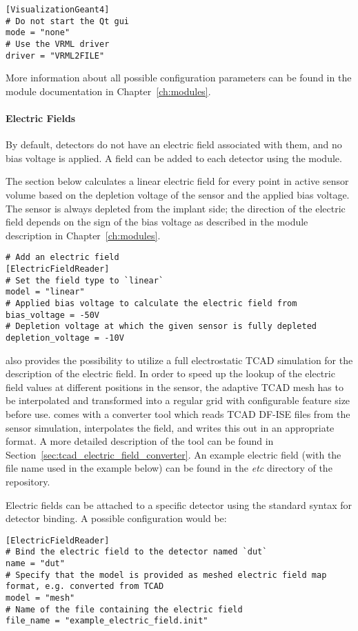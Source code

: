 \begin{itemize}
\begin{verbatim}
[VisualizationGeant4]
# Do not start the Qt gui
mode = "none"
# Use the VRML driver
driver = "VRML2FILE"
\end{verbatim}

More information about all possible configuration parameters can be found in the module documentation in Chapter~\ref{ch:modules}.

\paragraph{Electric Fields}
\label{sec:module_electric_field}
By default, detectors do not have an electric field associated with them, and no bias voltage is applied.
A field can be added to each detector using the  module.

The section below calculates a linear electric field for every point in active sensor volume based on the depletion voltage of the sensor and the applied bias voltage.
The sensor is always depleted from the implant side; the direction of the electric field depends on the sign of the bias voltage as described in the module description in Chapter~\ref{ch:modules}.
\begin{verbatim}
# Add an electric field
[ElectricFieldReader]
# Set the field type to `linear`
model = "linear"
# Applied bias voltage to calculate the electric field from
bias_voltage = -50V
# Depletion voltage at which the given sensor is fully depleted
depletion_voltage = -10V
\end{verbatim}

\apsq also provides the possibility to utilize a full electrostatic TCAD simulation for the description of the electric field.
In order to speed up the lookup of the electric field values at different positions in the sensor, the adaptive TCAD mesh has to be interpolated and transformed into a regular grid with configurable feature size before use.
\apsq comes with a converter tool which reads TCAD DF-ISE files from the sensor simulation, interpolates the field, and writes this out in an appropriate format.
A more detailed description of the tool can be found in Section~\ref{sec:tcad_electric_field_converter}.
An example electric field (with the file name used in the example below) can be found in the \textit{etc} directory of the \apsq repository.

Electric fields can be attached to a specific detector using the standard syntax for detector binding.
A possible configuration would be:
\begin{verbatim}
[ElectricFieldReader]
# Bind the electric field to the detector named `dut`
name = "dut"
# Specify that the model is provided as meshed electric field map format, e.g. converted from TCAD
model = "mesh"
# Name of the file containing the electric field
file_name = "example_electric_field.init"
\end{verbatim}


\end{itemize}

